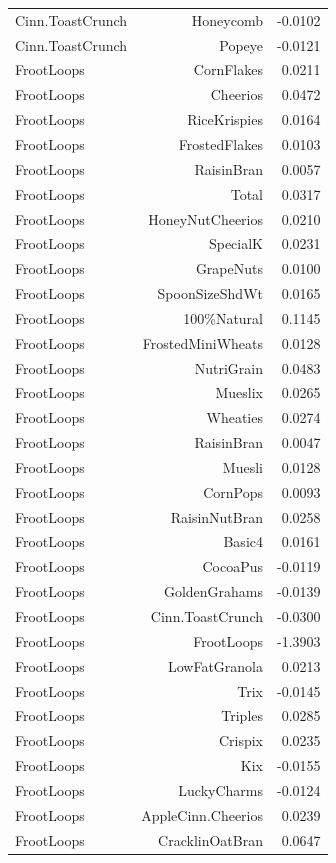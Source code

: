 \begin{longtable}{@{}lrr@{}}
Cinn.ToastCrunch & Honeycomb & -0.0102 \\
Cinn.ToastCrunch & Popeye & -0.0121 \\
FrootLoops & CornFlakes & 0.0211 \\
FrootLoops & Cheerios & 0.0472 \\
FrootLoops & RiceKrispies & 0.0164 \\
FrootLoops & FrostedFlakes & 0.0103 \\
FrootLoops & RaisinBran & 0.0057 \\
FrootLoops & Total & 0.0317 \\
FrootLoops & HoneyNutCheerios & 0.0210 \\
FrootLoops & SpecialK & 0.0231 \\
FrootLoops & GrapeNuts & 0.0100 \\
FrootLoops & SpoonSizeShdWt & 0.0165 \\
FrootLoops & 100\%Natural & 0.1145 \\
FrootLoops & FrostedMiniWheats & 0.0128 \\
FrootLoops & NutriGrain & 0.0483 \\
FrootLoops & Mueslix & 0.0265 \\
FrootLoops & Wheaties & 0.0274 \\
FrootLoops & RaisinBran & 0.0047 \\
FrootLoops & Muesli & 0.0128 \\
FrootLoops & CornPops & 0.0093 \\
FrootLoops & RaisinNutBran & 0.0258 \\
FrootLoops & Basic4 & 0.0161 \\
FrootLoops & CocoaPus & -0.0119 \\
FrootLoops & GoldenGrahams & -0.0139 \\
FrootLoops & Cinn.ToastCrunch & -0.0300 \\
FrootLoops & FrootLoops & -1.3903 \\
FrootLoops & LowFatGranola & 0.0213 \\
FrootLoops & Trix & -0.0145 \\
FrootLoops & Triples & 0.0285 \\
FrootLoops & Crispix & 0.0235 \\
FrootLoops & Kix & -0.0155 \\
FrootLoops & LuckyCharms & -0.0124 \\
FrootLoops & AppleCinn.Cheerios & 0.0239 \\
FrootLoops & CracklinOatBran & 0.0647 \\

\end{longtable}
